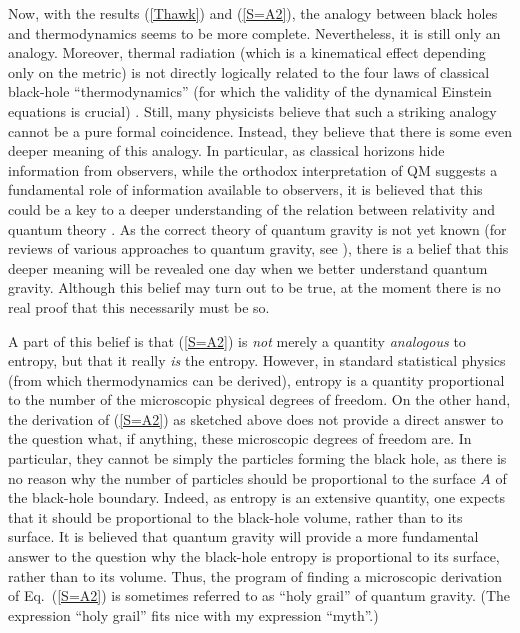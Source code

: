 \documentclass[12pt]{article}
\begin{document}
Now, with the results (\ref{Thawk}) and (\ref{S=A2}), the analogy
between black holes and thermodynamics seems to be more complete.
Nevertheless, it is still only an analogy. Moreover, 
thermal radiation (which is a kinematical effect depending 
only on the metric) is not directly logically related to the four laws 
of classical black-hole ``thermodynamics'' (for which the validity
of the dynamical Einstein equations is crucial) \cite{viss}. 
Still, many physicists
believe that such a striking analogy cannot be a pure formal coincidence.
Instead, they believe that there is some even deeper meaning of this 
analogy. In particular, as classical horizons hide information from 
observers, while the orthodox interpretation of QM suggests a 
fundamental role of information available to observers, it is   
believed that this could be a key to a deeper understanding
of the relation between relativity and quantum theory \cite{peres}. 
As the correct theory of quantum gravity is not yet 
known (for reviews of various approaches to quantum gravity, 
see \cite{carl,alvar}), there is a belief that this deeper 
meaning will be revealed one day when we better
understand quantum gravity. Although this belief may turn out 
to be true, at the moment there is no real proof that this 
necessarily must be so.  

A part of this belief is that (\ref{S=A2}) is {\em not} merely
a quantity {\em analogous} to entropy, but that it really {\em is}
the entropy. However, in standard statistical physics (from which 
thermodynamics can be derived), entropy is a quantity 
proportional to the number of the microscopic physical degrees of 
freedom. On the other hand, the derivation of (\ref{S=A2})
as sketched above does not provide a direct answer to the 
question what, if anything, these microscopic degrees of freedom are.
In particular, they cannot be simply the particles forming
the black hole, as there is no reason why the number of particles 
should be proportional to the surface $A$ of the black-hole boundary.
Indeed, as entropy is an extensive quantity, one expects 
that it should be proportional to the black-hole volume, rather 
than to its surface. It is believed that quantum gravity
will provide a more fundamental answer to the question
why the black-hole entropy is proportional to its surface, 
rather than to its volume.
Thus, the program of finding a microscopic derivation
of Eq.~(\ref{S=A2}) is sometimes referred to as  
``holy grail'' of quantum gravity. (The expression ``holy grail''
fits nice with my expression ``myth''.)    
\end{document}

